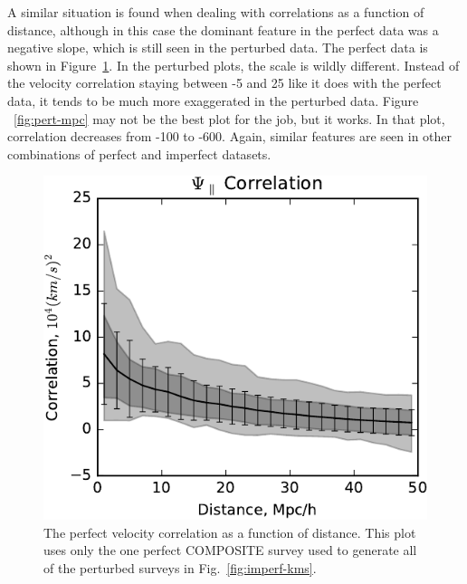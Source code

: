 \documentclass[usenatbib]{mn2e}
\begin{document}
A similar situation is found when dealing with correlations as a function of distance, although in this case the dominant feature in the perfect data was a negative slope, which is still seen in the perturbed data. The perfect data is shown in Figure~\ref{fig:perf-mpc}. In the perturbed plots, the scale is wildly different. Instead of the velocity correlation staying between -5 and 25 like it does with the perfect data, it tends to be much more exaggerated in the perturbed data. Figure ~\ref{fig:pert-mpc} may not be the best plot for the job, but it works. In that plot, correlation decreases from -100 to -600. Again, similar features are seen in other combinations of perfect and imperfect datasets.

\begin{figure}
  \begin{center}
  \includegraphics[scale=0.75]{psipar-perf-Mpch.pdf}
  \end{center}
\caption{\small
The perfect velocity correlation as a function of distance. This plot uses only the one perfect COMPOSITE survey used to generate all of the perturbed surveys in Fig.~\ref{fig:imperf-kms}.
}
\label{fig:perf-mpc}
\end{figure}
\end{document}
